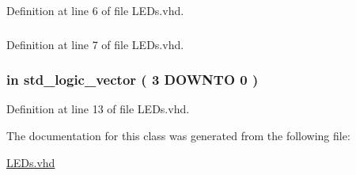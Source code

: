 Definition at line 6 of file L\+E\+Ds.\+vhd.

\hypertarget{class_l_e_ds_a598da929e807d58939b47499e8bc9fa8}{}
\subsubsection[{std\+\_\+logic\+\_\+unsigned}]{\hspace{0.3cm}{\ttfamily [Package]}}\label{class_l_e_ds_a598da929e807d58939b47499e8bc9fa8}


Definition at line 7 of file L\+E\+Ds.\+vhd.

\hypertarget{class_l_e_ds_a30974727c81621f672f7f9490463f9d3}{}
\subsubsection[{S\+W}]{ {\bfseries \textcolor{keywordflow}{in}\textcolor{vhdlchar}{ }} {\bfseries \textcolor{comment}{std\+\_\+logic\+\_\+vector}\textcolor{vhdlchar}{ }\textcolor{vhdlchar}{(}\textcolor{vhdlchar}{ }\textcolor{vhdlchar}{ } \textcolor{vhdldigit}{3} \textcolor{vhdlchar}{ }\textcolor{keywordflow}{D\+O\+W\+N\+T\+O}\textcolor{vhdlchar}{ }\textcolor{vhdlchar}{ } \textcolor{vhdldigit}{0} \textcolor{vhdlchar}{ }\textcolor{vhdlchar}{)}\textcolor{vhdlchar}{ }} \hspace{0.3cm}{\ttfamily [Port]}}\label{class_l_e_ds_a30974727c81621f672f7f9490463f9d3}


Definition at line 13 of file L\+E\+Ds.\+vhd.



The documentation for this class was generated from the following file\+:\begin{DoxyCompactItemize}
\item 
\hyperlink{_l_e_ds_8vhd}{L\+E\+Ds.\+vhd}\end{DoxyCompactItemize}
